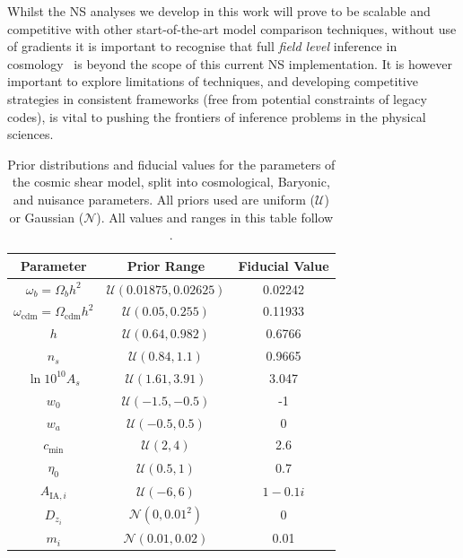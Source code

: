 \documentclass[twocolumn]{openjournal}
\begin{document}
Whilst the NS analyses we develop in this work will prove to be scalable and competitive with other start-of-the-art model comparison techniques, without use of gradients it is important to recognise that full \emph{field level} inference in cosmology~\citep[e.g.][]{Jasche_2013, Porqueres_2021, Porqueres_2021_b, bayer2023fieldlevelinferencemicrocanonicallangevin, spuriomancini2024fieldlevelcosmologicalmodelselection, babic2025straighteningrulerfieldlevelinference, Lanzieri_2025} is beyond the scope of this current NS implementation. It is however important to explore limitations of techniques, and developing competitive strategies in consistent frameworks (free from potential constraints of legacy codes), is vital to pushing the frontiers of inference problems in the physical sciences.
\begin{table}[t]
\centering
\caption{Prior distributions and fiducial values for the parameters of the cosmic shear model, split into cosmological, Baryonic, and nuisance parameters. All priors used are uniform ($\mathcal{U}$) or Gaussian ($\mathcal{N}$). All values and ranges in this table follow \cite{Piras_2023}.}
\label{tab:shearpriors}
\begin{tabular}{c c c}
\toprule
\textbf{Parameter} & \textbf{Prior Range} & \textbf{Fiducial Value} \\
\midrule

$\omega_b = \Omega_b h^2$ & $\mathcal{U}(0.01875, 0.02625)$ & 0.02242\\
$\omega_\text{cdm} = \Omega_\text{cdm} h^2$ &  $\mathcal{U}(0.05, 0.255)$ & 0.11933 \\
$h$ &  $\mathcal{U}(0.64, 0.982)$& 0.6766 \\
$n_s$ & $\mathcal{U}(0.84, 1.1)$ & 0.9665 \\
$\ln 10^{10}A_s$ & $\mathcal{U}(1.61, 3.91)$ & 3.047 \\
$w_0$ &  $\mathcal{U}(-1.5, -0.5)$ & -1\\
$w_a$ &  $\mathcal{U}(-0.5, 0.5)$ & 0\\
\midrule
$c_\text{min}$ & $\mathcal{U}(2, 4)$ & 2.6 \\
$\eta_0$ & $\mathcal{U}(0.5, 1)$  & 0.7\\

\midrule

$A_{\text{IA},i}$  & $\mathcal{U}(-6, 6)$ & $1-0.1i$\\
$D_{z_i}$ & $\mathcal{N}(0, 0.01^2)$ & 0\\
$m_i$   & $\mathcal{N}(0.01, 0.02)$  & 0.01 \\
\bottomrule
\end{tabular}
\end{table}
\end{document}
